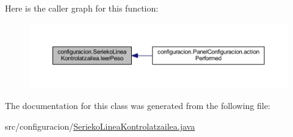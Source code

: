 Here is the caller graph for this function\+:
\nopagebreak
\begin{figure}[H]
\begin{center}
\leavevmode
\includegraphics[width=350pt]{classconfiguracion_1_1_serieko_linea_kontrolatzailea_ad70433445ac917689add8ffc146ccb3c_icgraph}
\end{center}
\end{figure}


The documentation for this class was generated from the following file\+:\begin{DoxyCompactItemize}
\item 
src/configuracion/\mbox{\hyperlink{_serieko_linea_kontrolatzailea_8java}{Serieko\+Linea\+Kontrolatzailea.\+java}}\end{DoxyCompactItemize}
